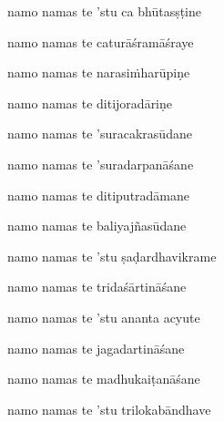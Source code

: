 \nemslokac 
namo namas te 'stu ca bhūtasṣṭine
\dontdisplaylinenum

\nemslokad 
namo namas te caturāśramāśraye \veg\dontdisplaylinenum
{}

\ujvers\nemsloka 
namo namas te narasiṁharūpiṇe
\dontdisplaylinenum

\nemslokab 
namo namas te ditijoradāriṇe \danda\dontdisplaylinenum

\nemslokac 
namo namas te 'suracakrasūdane
\dontdisplaylinenum

\nemslokad 
namo namas te 'suradarpanāśane \veg\dontdisplaylinenum
{}

\ujvers\nemsloka 
namo namas te ditiputradāmane
\dontdisplaylinenum

\nemslokab 
namo namas te baliyajñasūdane \danda\dontdisplaylinenum

\nemslokac 
namo namas te 'stu ṣaḍardhavikrame
\dontdisplaylinenum

\nemslokad 
namo namas te tridaśārtināśane \veg\dontdisplaylinenum
{}

\ujvers\nemsloka 
namo namas te 'stu ananta acyute
\dontdisplaylinenum

\nemslokab 
namo namas te jagadartināśane \danda\dontdisplaylinenum

\nemslokac 
namo namas te madhukaiṭanāśane
\dontdisplaylinenum

\nemslokad 
namo namas te 'stu trilokabāndhave \veg\dontdisplaylinenum
{}

